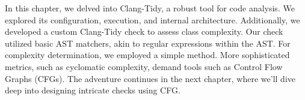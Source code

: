 In this chapter, we delved into Clang-Tidy, a robust tool for code analysis. We explored its configuration, execution, and internal architecture. Additionally, we developed a custom Clang-Tidy check to assess class complexity. Our check utilized basic AST matchers, akin to regular expressions within the AST. For complexity determination, we employed a simple method. More sophisticated metrics, such as cyclomatic complexity, demand tools such as Control Flow Graphs (CFGs). The adventure continues in the next chapter, where we’ll dive deep into designing intricate checks using CFG.